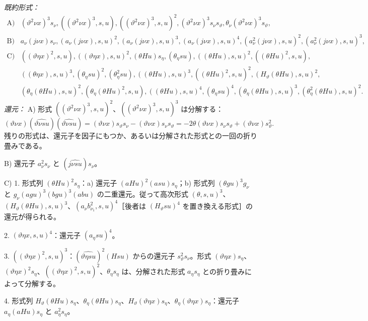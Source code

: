 \documentclass[11pt]{article}
\begin{document}
\noindent\emph{既約形式：}
\[
\begin{array}{rl}
\text{A)}& (\vartheta^2\nu x)^3s_\nu,
((\vartheta^2\nu x)^3,s,u),
((\vartheta^2\nu x)^3,s,u)^2,
(\vartheta^2\nu x)^3s_\nu s_\vartheta,
\theta_\nu(\vartheta^2\nu x)^3s_\vartheta,\\[0.3em]
\text{B)}& a_\nu(j\nu x)s_\nu,
(a_\nu(j\nu x),s,u)^2,
(a_\nu(j\nu x),s,u)^3,
(a_\nu(j\nu x),s,u)^4,
(a_\nu^2(j\nu x),s,u)^2,
(a_\nu^2(j\nu x),s,u)^3,\\[0.3em]
\text{C)}& ((\vartheta\eta x)^2,s,u),
((\vartheta\eta x),s,u)^2,
(\theta Hu)s_\eta,
(\theta_\eta su),
((\theta Hu),s,u)^2,
((\theta Hu)^2,s,u),\\
& ((\theta\eta x),s,u)^3,
(\theta_\eta su)^2,
(\theta_\eta^2su),
((\theta Hu),s,u)^3,
((\theta Hu)^2,s,u)^2,
(H_\vartheta(\theta Hu),s,u)^2,\\
& (\theta_\eta(\theta Hu),s,u)^2,
(\theta_\eta(\theta Hu)^2,s,u),
((\theta Hu),s,u)^4,
(\theta_\eta su)^4,
(\theta_\eta(\theta Hu),s,u)^3,
(\theta_\eta^2(\theta Hu),s,u)^2.
\end{array}
\]
\noindent\emph{還元：}
A) 形式 $((\vartheta^2\nu x)^3,s,u)^2$、$((\vartheta^2\nu x)^3,s,u)^3$ は分解する：
\[
(\vartheta\nu x)(\widehat{\vartheta\nu su})(\widehat{\vartheta\nu su})=(\vartheta\nu x)s_\vartheta s_\nu-(\vartheta\nu x)s_\nu s_\vartheta=-2\theta(\vartheta\nu x)s_\nu s_\vartheta+(\vartheta\nu x)s_\vartheta^2.
\]
残りの形式は、還元子を因子にもつか、あるいは分解された形式との一回の折り畳みである。

B) 還元子 $a_\nu^2s_\nu$ と $(\widehat{j\nu su})s_\nu$。

C) 1. 形式列 $(\theta Hu)^2s_\eta$：a) 還元子 $(aHu)^2(asu)s_\eta$；b) 形式列 $(\theta gu)^3g_\nu$ と $g_\nu(agu)^3(bgu)^3(abu)$ の二重還元。従って高次形式 $(\theta,s,u)^3$、$(H_\vartheta(\theta Hu),s,u)^3$、$(a_\nu b_{\nu_1}^2,s,u)^4$［後者は $(H_\vartheta su)^4$ を置き換える形式］の還元が得られる。

2. $(\vartheta\eta x,s,u)^4$：還元子 $(a_\eta su)^4$。

3. $((\vartheta\eta x)^2,s,u)^3$：$(\widehat{\vartheta\eta su})^2(Hsu)$ からの還元子 $s_\vartheta^2s_\nu$。形式 $(\vartheta\eta x)s_\eta$、$(\vartheta\eta x)^2s_\eta$、$((\vartheta\eta x)^2,s,u)^2$、$\theta_\eta s_\eta$ は、分解された形式 $a_\eta s_\eta$ との折り畳みによって分解する。

4. 形式列 $H_\vartheta(\theta Hu)s_\eta$、$\theta_\eta(\theta Hu)s_\eta$、$H_\vartheta(\vartheta\eta x)s_\eta$、$\theta_\eta(\vartheta\eta x)s_\eta$：還元子 $a_\eta(aHu)s_\eta$ と $a_\eta^2s_\eta$。
\end{document}
